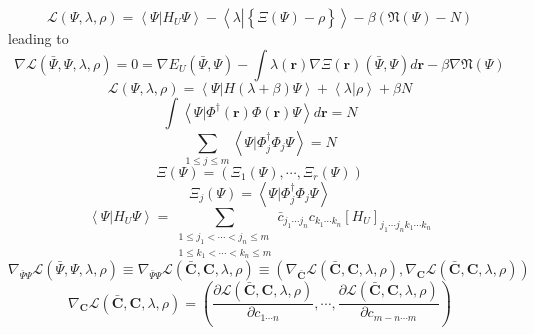 \documentclass[prl,twocolumn]{revtex4}%
\begin{document}
\[
\mathcal{L}\left(  \Psi,\lambda,\rho\right)  =\left\langle \left.
\Psi\right\vert H_{U}\Psi\right\rangle -\left\langle \lambda\left\vert
\left\{  \overset{}{\Xi\left(  \Psi\right)  -\rho}\right\}  \right.
\right\rangle -\beta\left(  \mathfrak{N}\left(  \Psi\right)  -N\right)
\]
leading to
\[
\nabla\mathcal{L}\left(  \bar{\Psi},\Psi,\lambda,\rho\right)  =0=\nabla
E_{U}\left(  \bar{\Psi},\Psi\right)  -\int\lambda\left(  \mathbf{r}\right)
\nabla\Xi\left(  \mathbf{r}\right)  \left(  \bar{\Psi},\Psi\right)
d\mathbf{r-}\beta\nabla\mathfrak{N}\left(  \Psi\right)
\]%
\[
\mathcal{L}\left(  \Psi,\lambda,\rho\right)  =\left\langle \left.
\Psi\right\vert H\left(  \lambda+\beta\right)  \Psi\right\rangle +\left\langle
\left.  \lambda\right\vert \rho\right\rangle +\beta N
\]%
\[
\int\left\langle \left.  \Psi\right\vert \Phi^{\dagger}\left(  \mathbf{r}%
\right)  \Phi\left(  \mathbf{r}\right)  \Psi\right\rangle d\mathbf{r}=N
\]%
\[
\sum_{1\leq j\leq m}\left\langle \left.  \Psi\right\vert \Phi_{j}^{\dagger
}\Phi_{j}\Psi\right\rangle =N
\]%
\begin{equation}
\Xi\left(  \Psi\right)  =\left(  \Xi_{1}\left(  \Psi\right)  ,\cdots,\Xi
_{r}\left(  \Psi\right)  \right)
\end{equation}%
\begin{equation}
\Xi_{j}\left(  \Psi\right)  =\left\langle \left.  \Psi\right\vert \Phi
_{j}^{\dagger}\Phi_{j}\Psi\right\rangle
\end{equation}%
\begin{equation}
\left\langle \left.  \Psi\right\vert H_{U}\Psi\right\rangle =\sum
_{\substack{1\leq j_{1}<\cdots<j_{n}\leq m\\1\leq k_{1}<\cdots<k_{n}\leq
m}}\bar{c}_{j_{1}\cdots j_{n}}c_{k_{1}\cdots k_{n}}\left[  H_{U}\right]
_{j_{1}\cdots j_{n}k_{1}\cdots k_{n}}%
\end{equation}%
\begin{equation}
\nabla_{\bar{\Psi}\Psi}\mathcal{L}\left(  \bar{\Psi},\Psi,\lambda,\rho\right)
\equiv\nabla_{\bar{\Psi}\Psi}\mathcal{L}\left(  \mathbf{\bar{C}}%
,\mathbf{C},\lambda,\rho\right)  \equiv\left(  \nabla_{\mathbf{\bar{C}}%
}\mathcal{L}\left(  \mathbf{\bar{C}},\mathbf{C},\lambda,\rho\right)
,\nabla_{\mathbf{C}}\mathcal{L}\left(  \mathbf{\bar{C}},\mathbf{C}%
,\lambda,\rho\right)  \right)
\end{equation}%
\begin{equation}
\nabla_{\mathbf{C}}\mathcal{L}\left(  \mathbf{\bar{C}},\mathbf{C},\lambda
,\rho\right)  =\left(  \frac{\partial\mathcal{L}\left(  \mathbf{\bar{C}%
},\mathbf{C},\lambda,\rho\right)  }{\partial c_{1\cdots n}},\cdots
,\frac{\partial\mathcal{L}\left(  \mathbf{\bar{C}},\mathbf{C},\lambda
,\rho\right)  }{\partial c_{m-n\cdots m}}\right)
\end{equation}%
\end{document}
